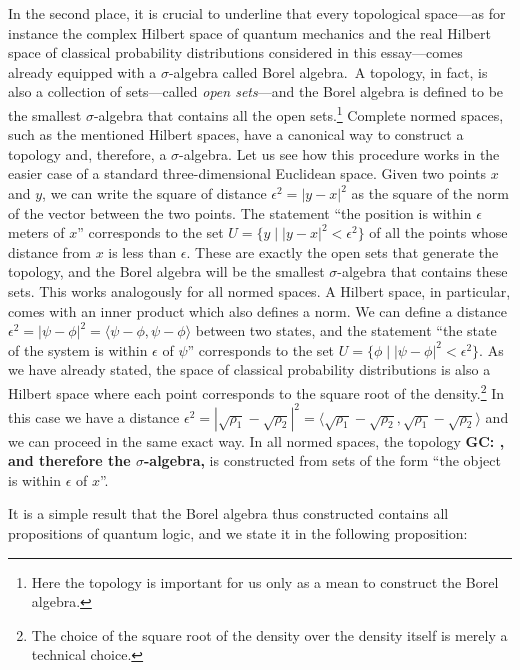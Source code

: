 \documentclass[11pt, executivepaper]{article}
\begin{document}
In the second place, it is crucial to underline that every topological space---as for instance the complex Hilbert space of quantum mechanics and the real Hilbert space of classical probability distributions considered in this essay---comes already equipped with a $\sigma$-algebra called Borel algebra.\ A topology, in fact, is also a collection of sets---called \emph{open sets}---and the Borel algebra is defined to be the smallest $\sigma$-algebra that contains all the open sets.\footnote{Here the topology is important for us only as a mean to construct the Borel algebra.} Complete normed spaces, such as the mentioned Hilbert spaces, have a canonical way to construct a topology and, therefore, a $\sigma$-algebra. Let us see how this procedure works in the easier case of a standard three-dimensional Euclidean space. Given two points $x$ and $y$, we can write the square of distance $\epsilon^2 = |y - x|^2$ as the square of the norm of the vector between the two points. The statement ``the position is within $\epsilon$ meters of $x$'' corresponds to the set $U = \{y \; | \; |y - x|^2 < \epsilon^2 \}$ of all the points whose distance from $x$ is less than $\epsilon$. These are exactly the open sets that generate the topology, and the Borel algebra will be the smallest $\sigma$-algebra that contains these sets. This works analogously for all normed spaces. A Hilbert space, in particular, comes with an inner product which also defines a norm. We can define a distance $\epsilon^2 = |\psi - \phi|^2=\langle \psi - \phi , \psi - \phi \rangle$ between two states, and the statement ``the state of the system is within $\epsilon$ of $\psi$'' corresponds to the set $U = \{\phi \; | \; |\psi - \phi|^2 < \epsilon^2\}$. As we have already stated, the space of classical probability distributions is also a Hilbert space where each point corresponds to the square root of the density.\footnote{The choice of the square root of the density over the density itself is merely a technical choice.} In this case we have a distance $\epsilon^2 = |\sqrt{\rho_1} - \sqrt{\rho_2}|^2=\langle \sqrt{\rho_1} - \sqrt{\rho_2} , \sqrt{\rho_1} - \sqrt{\rho_2} \rangle$ and we can proceed in the same exact way. In all normed spaces, the topology \textbf{GC: , and therefore the $\sigma$-algebra,} is constructed from sets of the form ``the object is within $\epsilon$ of $x$''.

It is a simple result that the Borel algebra thus constructed contains all propositions of quantum logic, and we state it in the following proposition:
\end{document}
